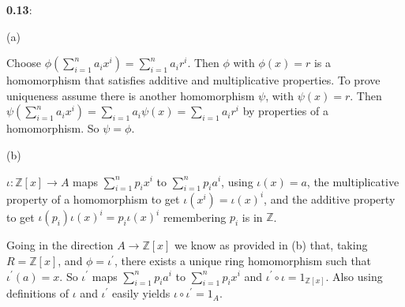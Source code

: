 \documentclass{article}
\begin{document}
\textbf{0.13}:

(a)

Choose $\phi(\sum_{i=1}^na_ix^i) = \sum_{i=1}^na_ir^i$. Then $\phi$ with $\phi(x)=r$ is a homomorphism that
satisfies additive and multiplicative properties. To prove uniqueness assume there is another
homomorphism $\psi$, with $\psi(x)=r$. Then $\psi(\sum_{i=1}^na_ix^i) = \sum_{i=1}a_i\psi(x) = \sum_{i=1}a_ir^i$ by properties of
a homomorphism. So $\psi=\phi$. \par


(b)

$\iota \colon \mathds{Z}[x] \rightarrow A$ maps
$\sum_{i=1}^n p_ix^i$ to $\sum_{i=1}^n p_ia^i$, using $\iota(x) = a$,
the multiplicative property of a homomorphism to get $\iota(x^i)=\iota(x)^i$,
and the additive property to get $\iota(p_i)\iota(x)^i = p_i\iota(x)^i$ remembering $p_i$ is in $\mathds{Z}$. \par

Going in the direction $A \rightarrow \mathds{Z}[x]$ we know as provided in (b) that,
taking $R=\mathds{Z}[x]$, and $\phi=\iota^\prime$, there exists a unique ring homomorphism such that $\iota^\prime(a)=x$.
So $\iota^\prime $ maps $\sum_{i=1}^np_ia^i$ to $\sum_{i=1}^{n}p_ix^i$ and $\iota^\prime \circ \iota = 1_{\mathds{Z}[x]}$.
Also using definitions of $\iota$ and $\iota^\prime$ easily yields $\iota \circ \iota^\prime = 1_A$.
\end{document}
